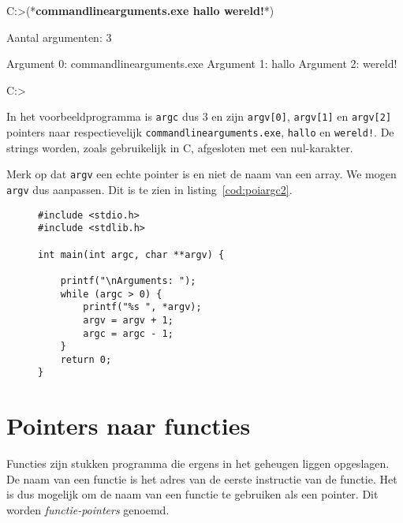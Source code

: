 \begin{dosbox}[title=Afdrukken van programmanaam en argumenten.,label=fig:poiargcv]
C:\Users\Cbook>(*\textbf{commandlinearguments.exe hallo wereld!}*)

Aantal argumenten: 3

Argument 0: commandlinearguments.exe
Argument 1: hallo
Argument 2: wereld!

C:\Users\Cbook>
\end{dosbox}

In het voorbeeldprogramma is \texttt{argc} dus 3 en zijn \texttt{argv[0]}, \texttt{argv[1]} en \texttt{argv[2]} pointers naar respectievelijk \texttt{commandlinearguments.exe}, \texttt{hallo} en \texttt{wereld!}. De strings worden, zoals gebruikelijk in C,  afgesloten met een nul-karakter.


Merk op dat \texttt{argv} een echte pointer is en niet de naam van een array. We mogen \texttt{argv} dus aanpassen. Dit is te zien in listing~\ref{cod:poiargc2}.

\begin{figure}[!ht]
\begin{lstlisting}[caption=Afdrukken van argumenten.,label=cod:poiargc2]
#include <stdio.h>
#include <stdlib.h>

int main(int argc, char **argv) {

    printf("\nArguments: ");
    while (argc > 0) {
        printf("%s ", *argv);
        argv = argv + 1;
        argc = argc - 1;
    }
    return 0;
}
\end{lstlisting}
\end{figure}


\section{Pointers naar functies}
\label{sec:pointersnaarfunctie}
Functies zijn stukken programma die ergens in het geheugen liggen opgeslagen. De naam van een functie is het adres van de eerste instructie van de functie. Het is dus mogelijk om de naam van een functie te gebruiken als een pointer. Dit worden \textsl{functie-pointers} genoemd.

